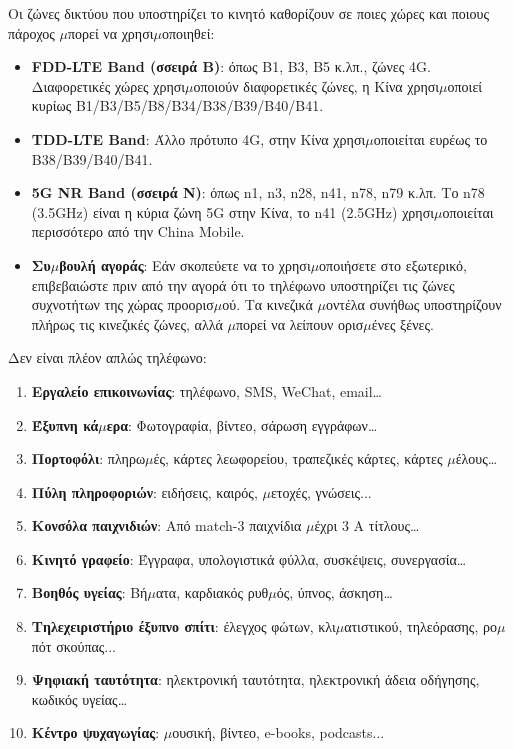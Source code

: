 
Οι ζώνες δικτύου που υποστηρίζει το κινητό καθορίζουν σε ποιες χώρες και ποιους πάροχος $\mu$πορεί να χρησι$\mu$οποιηθεί:

\begin{itemize}
  \item \textbf{FDD-LTE Band (σσειρά B)}: όπως B1, B3, B5 κ.λπ., ζώνες 4G. Διαφορετικές χώρες χρησι$\mu$οποιούν διαφορετικές ζώνες, η Κίνα χρησι$\mu$οποιεί κυρίως B1/B3/B5/B8/B34/B38/B39/B40/B41.
  \item \textbf{TDD-LTE Band}: Άλλο πρότυπο 4G, στην Κίνα χρησι$\mu$οποιείται ευρέως το B38/B39/B40/B41.
  \item \textbf{5G NR Band (σσειρά N)}: όπως n1, n3, n28, n41, n78, n79 κ.λπ. Το n78 (3.5GHz) είναι η κύρια ζώνη 5G στην Κίνα, το n41 (2.5GHz) χρησι$\mu$οποιείται περισσότερο από την China Mobile.
  \item \textbf{Συ$\mu$βουλή αγοράς}: Εάν σκοπεύετε να το χρησι$\mu$οποιήσετε στο εξωτερικό, επιβεβαιώστε πριν από την αγορά ότι το τηλέφωνο υποστηρίζει τις ζώνες συχνοτήτων της χώρας προορισ$\mu$ού. Τα κινεζικά $\mu$οντέλα συνήθως υποστηρίζουν πλήρως τις κινεζικές ζώνες, αλλά $\mu$πορεί να λείπουν ορισ$\mu$ένες ξένες.
\end{itemize}


Δεν είναι πλέον απλώς τηλέφωνο:

\begin{enumerate}
  \item \textbf{Εργαλείο επικοινωνίας}: τηλέφωνο, SMS, WeChat, email…
  \item \textbf{Έξυπνη κά$\mu$ερα}: Φωτογραφία, βίντεο, σάρωση εγγράφων…
  \item \textbf{Πορτοφόλι}: πληρω$\mu$ές, κάρτες λεωφορείου, τραπεζικές κάρτες, κάρτες $\mu$έλους…
  \item \textbf{Πύλη πληροφοριών}: ειδήσεις, καιρός, $\mu$ετοχές, γνώσεις...
  \item \textbf{Κονσόλα παιχνιδιών}: Από match-3 παιχνίδια $\mu$έχρι 3 Α τίτλους…
  \item \textbf{Κινητό γραφείο}: Έγγραφα, υπολογιστικά φύλλα, συσκέψεις, συνεργασία…
  \item \textbf{Βοηθός υγείας}: Βή$\mu$ατα, καρδιακός ρυθ$\mu$ός, ύπνος, άσκηση…
  \item \textbf{Τηλεχειριστήριο έξυπνο σπίτι}: έλεγχος φώτων, κλι$\mu$ατιστικού, τηλεόρασης, ρο$\mu$πότ σκούπας...
  \item \textbf{Ψηφιακή ταυτότητα}: ηλεκτρονική ταυτότητα, ηλεκτρονική άδεια οδήγησης, κωδικός υγείας…
  \item \textbf{Κέντρο ψυχαγωγίας}: $\mu$ουσική, βίντεο, e-books, podcasts...
\end{enumerate}

